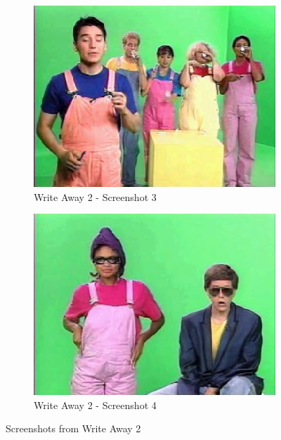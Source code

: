 \begin{figure}[H]
    \begin{subfigure}{0.45\textwidth}
        \centering
        \includegraphics[width=\linewidth]{Games/WriteAway/Images/WriteAway2Screenshot3.png}
        \caption{Write Away 2 - Screenshot 3}
    \end{subfigure}
    \begin{subfigure}{0.45\textwidth}
        \centering
        \includegraphics[width=\linewidth]{Games/WriteAway/Images/WriteAway2Screenshot4.png}
        \caption{Write Away 2 - Screenshot 4}
    \end{subfigure}
    \caption{Screenshots from Write Away 2}
\end{figure}